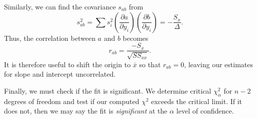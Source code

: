 Similarly, we can find the covariance $s_{ab}$ from
\begin{equation}
s^2_{ab} = \sum s ^2_i \left( \frac{\partial a}{\partial y_i} \right)
\left( \frac{\partial b}{\partial y_i}\right) = -\frac{S_x}{\Delta}.
\end{equation}
Thus, the correlation between $a$ and $b$ becomes
\begin{equation}
r_{ab} = \frac{-S_x}{\sqrt{SS_{xx}}}.
\label{eq:uncorrelated_a_b}
\end{equation}
It is therefore useful to shift the origin to $\bar{x}$ so that $r_{ab} = 0$, leaving our estimates for slope and intercept uncorrelated.  

	Finally, we must check if the fit is significant.  We determine 
critical $\chi ^2_\alpha$ for $n - 2$ degrees of freedom and test if our computed $\chi^2$ exceeds the critical limit.  If it 
does not, then we may say the fit is \emph{significant} at the $\alpha$ level of confidence.

